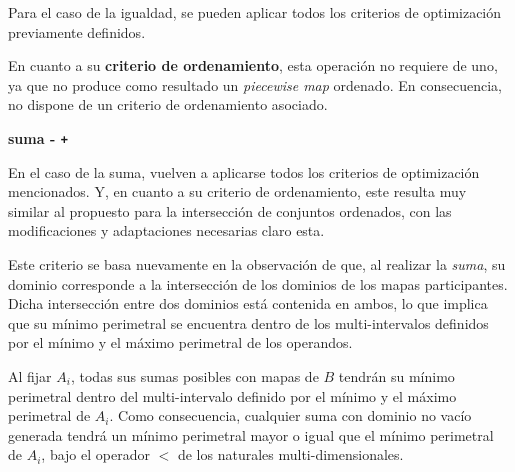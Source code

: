 Para el caso de la igualdad, se pueden aplicar todos los criterios de optimización previamente definidos. 

En cuanto a su \textbf{criterio de ordenamiento}, esta operación no requiere de uno, ya que no produce como resultado un \textit{piecewise map} ordenado. En consecuencia, no dispone de un criterio de ordenamiento asociado.

\textbf{suma - \texttt{+}}

En el caso de la suma, vuelven a aplicarse todos los criterios de optimización mencionados. Y, en cuanto a su criterio de ordenamiento, este resulta muy similar al propuesto para la intersección de conjuntos ordenados, con las modificaciones y adaptaciones necesarias claro esta.


\begin{center}
\end{center}

Este criterio se basa nuevamente en la observación de que, al realizar la \textit{suma}, 
su dominio corresponde a la intersección de los dominios de los mapas participantes. 
Dicha intersección entre dos dominios está contenida en ambos, lo que implica que su mínimo perimetral 
se encuentra dentro de los multi-intervalos definidos por el mínimo y el máximo perimetral de los operandos.  

Al fijar \(A_i\), todas sus sumas posibles con mapas de \(B\) tendrán su mínimo perimetral dentro del multi-intervalo definido por el mínimo y el máximo perimetral de \(A_i\). 
Como consecuencia, cualquier suma con dominio no vacío generada tendrá un mínimo perimetral mayor o igual 
que el mínimo perimetral de \(A_i\), bajo el operador $<$ de los naturales multi-dimensionales.


